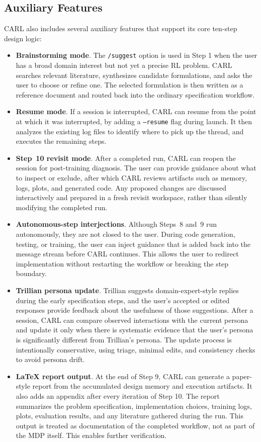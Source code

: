 \documentclass[mnsc,sglanonrev]{informs4}
\begin{document}
\subsection{Auxiliary Features}
\label{sec:aux}

CARL also includes several auxiliary features that support its core ten-step design logic:
\begin{itemize}
\item \textbf{Brainstorming mode}. The \texttt{/suggest} option is used in Step 1 when the user has a broad domain interest but not yet a precise RL problem. CARL searches relevant literature, synthesizes candidate formulations, and asks the user to choose or refine one. The selected formulation is then written as a reference document and routed back into the ordinary specification workflow.
\item \textbf{Resume mode}. If a session is interrupted, CARL can resume from the point at which it was interrupted, by adding a \texttt{--resume} flag during launch. It then analyzes the existing log files to identify where to pick up the thread, and executes the remaining steps.
\item \textbf{Step~10 revisit mode}. After a completed run, CARL can reopen the session for post-training diagnosis. The user can provide guidance about what to inspect or exclude, after which CARL reviews artifacts such as memory, logs, plots, and generated code. Any proposed changes are discussed interactively and prepared in a fresh revisit workspace, rather than silently modifying the completed run.
\item \textbf{Autonomous-step interjections}. Although Steps~8 and~9 run autonomously, they are not closed to the user. During code generation, testing, or training, the user can inject guidance that is added back into the message stream before CARL continues. This allows the user to redirect implementation without restarting the workflow or breaking the step boundary.
\item \textbf{Trillian persona update}. Trillian suggests domain-expert-style replies during the early specification steps, and the user's accepted or edited responses provide feedback about the usefulness of those suggestions. After a session, CARL can compare observed interactions with the current persona and update it only when there is systematic evidence that the user's persona is significantly different from Trillian's persona. The update process is intentionally conservative, using triage, minimal edits, and consistency checks to avoid persona drift. 
\item \textbf{\LaTeX{} report output}. At the end of Step 9, CARL can generate a paper-style report from the accumulated design memory and execution artifacts. It also adds an appendix after every iteration of Step 10. The report summarizes the problem specification, implementation choices, training logs, plots, evaluation results, and any literature gathered during the run. This output is treated as documentation of the completed workflow, not as part of the MDP itself. This enables further verification.
\end{itemize}
\end{document}
